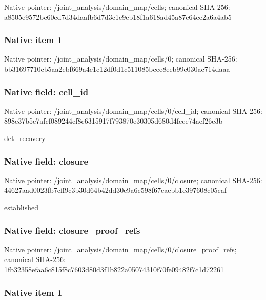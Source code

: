 \documentclass[10pt,a4paper]{article}
\begin{document}
Native pointer: /joint\_analysis/domain\_map/cells; canonical SHA-256: a8505e9572bc60ed7d34daaf\allowbreak{}b6d7d3c1e9eb18f1a618ad45\allowbreak{}a87c64ee2a6a4ab5



\subsubsection{Native item 1}


Native pointer: /joint\_analysis/domain\_map/cells/0; canonical SHA-256: bb31697710cb5aa2ebf669a4\allowbreak{}e1c12df0d1c511085bcee8ee\allowbreak{}b99e030ac714daaa



\subsubsection{Native field: cell\_id}


Native pointer: /joint\_analysis/domain\_m\allowbreak{}ap/cells/0/cell\_id; canonical SHA-256: 898e37b5c7afcf089244cf8c\allowbreak{}6315917f793870e30305d680\allowbreak{}d4fece74aef26e3b


det\_recovery


\subsubsection{Native field: closure}


Native pointer: /joint\_analysis/domain\_m\allowbreak{}ap/cells/0/closure; canonical SHA-256: 44627aad0023fb7cff9c3b30\allowbreak{}d64b42dd30e9a6c598f67cae\allowbreak{}bb1c397608c05caf


established


\subsubsection{Native field: closure\_proof\_refs}


Native pointer: /joint\_analysis/domain\_m\allowbreak{}ap/cells/0/closure\_proof\allowbreak{}\_refs; canonical SHA-256: 1fb32358efaa6c815f8c7603\allowbreak{}d80d3f1b822a05074310f70f\allowbreak{}e09482f7c1d72261



\subsubsection{Native item 1}
\end{document}
